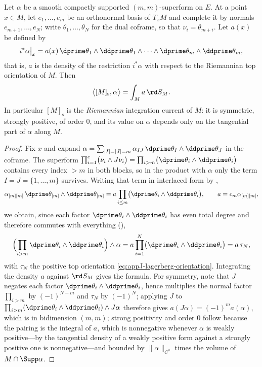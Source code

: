 \begin{lemma}
\label{lem:ch14-berndtsson-pairing}
Let $\alpha$ be a smooth compactly supported $(m,m)$-superform on $E$.  At a
point $x\in M$, let $e_1,\ldots,e_m$ be an orthonormal basis of $T_xM$ and
complete it by normals $e_{m+1},\ldots,e_N$; write $\theta_1,\ldots,\theta_N$
for the dual coframe, so that $\nu_i=\theta_{m+i}$.  Let $a(x)$ be defined by
\[
 i^*\alpha\bigr|_x
 =a(x)\,\dprime\theta_1\wedge\ddprime\theta_1\wedge\cdots
        \wedge\dprime\theta_m\wedge\ddprime\theta_m ,
\]
that is, $a$ is the density of the restriction $i^*\alpha$ with respect to
the Riemannian top orientation of $M$.  Then
\[
 \bigl\langle[M]_{\mathrm s},\alpha\bigr\rangle
 =\int_Ma\,\rd S_M .
\]
In particular $[M]_{\mathrm s}$ is the \emph{Riemannian} integration current
of $M$: it is symmetric, strongly positive, of order $0$, and its value on
$\alpha$ depends only on the tangential part of $\alpha$ along $M$.
\end{lemma}

\begin{proof}
Fix $x$ and expand
$\alpha=\sum_{|I|=|J|=m}\alpha_{IJ}\,\dprime\theta_I\wedge\ddprime\theta_J$
in the coframe.  The superform
$\prod_{i=1}^{c}\bigl(\nu_i\wedge J\nu_i\bigr)
=\prod_{i>m}\bigl(\dprime\theta_i\wedge\ddprime\theta_i\bigr)$
contains every index $>m$ in both blocks, so in the product with $\alpha$
only the term $I=J=\{1,\ldots,m\}$ survives.  Writing that term in interlaced
form by ,
\[
 \alpha_{[m][m]}\,\dprime\theta_{[m]}\wedge\ddprime\theta_{[m]}
 =a\prod_{i\le m}\bigl(\dprime\theta_i\wedge\ddprime\theta_i\bigr),
 \qquad a=c_m\alpha_{[m][m]},
\]
we obtain, since each factor $\dprime\theta_i\wedge\ddprime\theta_i$ has even
total degree and therefore commutes with everything
(),
\[
 \Bigl(\prod_{i>m}\dprime\theta_i\wedge\ddprime\theta_i\Bigr)\wedge\alpha
 =a\prod_{i=1}^{N}\bigl(\dprime\theta_i\wedge\ddprime\theta_i\bigr)
 =a\,\tau_N,
\]
with $\tau_N$ the positive top orientation
\eqref{eq:appJ-lagerberg-orientation}.  Integrating the density
$a$ against $\rd S_M$ gives the formula.  For symmetry, note that $J$ negates
each factor $\dprime\theta_i\wedge\ddprime\theta_i$, hence multiplies the
normal factor $\prod_{i>m}$ by $(-1)^{N-m}$ and $\tau_N$ by $(-1)^N$;
applying $J$ to $\prod_{i>m}(\dprime\theta_i\wedge\ddprime\theta_i)\wedge
J\alpha$ therefore gives $a(J\alpha)=(-1)^ma(\alpha)$, which is
 in bidimension $(m,m)$; strong positivity
and order $0$ follow because the pairing is the integral of $a$, which is
nonnegative whenever $\alpha$ is weakly positive---by
 the tangential density of a weakly
positive form against a strongly positive one is nonnegative---and bounded
by $\|\alpha\|_{C^0}$ times the volume of $M\cap\Supp\alpha$.
\end{proof}

